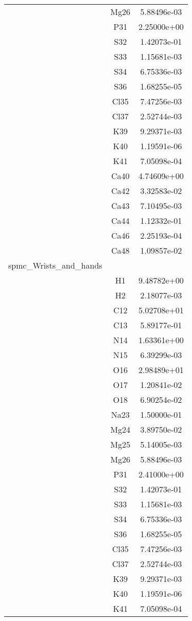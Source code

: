 \begin{centering}
\begin{longtable}{l c c}
& Mg26 & 5.88496e-03 \\ 
& P31 & 2.25000e+00 \\ 
& S32 & 1.42073e-01 \\ 
& S33 & 1.15681e-03 \\ 
& S34 & 6.75336e-03 \\ 
& S36 & 1.68255e-05 \\ 
& Cl35 & 7.47256e-03 \\ 
& Cl37 & 2.52744e-03 \\ 
& K39 & 9.29371e-03 \\ 
& K40 & 1.19591e-06 \\ 
& K41 & 7.05098e-04 \\ 
& Ca40 & 4.74609e+00 \\ 
& Ca42 & 3.32583e-02 \\ 
& Ca43 & 7.10495e-03 \\ 
& Ca44 & 1.12332e-01 \\ 
& Ca46 & 2.25193e-04 \\ 
& Ca48 & 1.09857e-02 \\ 
\hline
spmc\_Wrists\_and\_hands & & \\
\hline
& H1 & 9.48782e+00 \\ 
& H2 & 2.18077e-03 \\ 
& C12 & 5.02708e+01 \\ 
& C13 & 5.89177e-01 \\ 
& N14 & 1.63361e+00 \\ 
& N15 & 6.39299e-03 \\ 
& O16 & 2.98489e+01 \\ 
& O17 & 1.20841e-02 \\ 
& O18 & 6.90254e-02 \\ 
& Na23 & 1.50000e-01 \\ 
& Mg24 & 3.89750e-02 \\ 
& Mg25 & 5.14005e-03 \\ 
& Mg26 & 5.88496e-03 \\ 
& P31 & 2.41000e+00 \\ 
& S32 & 1.42073e-01 \\ 
& S33 & 1.15681e-03 \\ 
& S34 & 6.75336e-03 \\ 
& S36 & 1.68255e-05 \\ 
& Cl35 & 7.47256e-03 \\ 
& Cl37 & 2.52744e-03 \\ 
& K39 & 9.29371e-03 \\ 
& K40 & 1.19591e-06 \\ 
& K41 & 7.05098e-04 \\ 

\end{longtable}
\end{centering}
